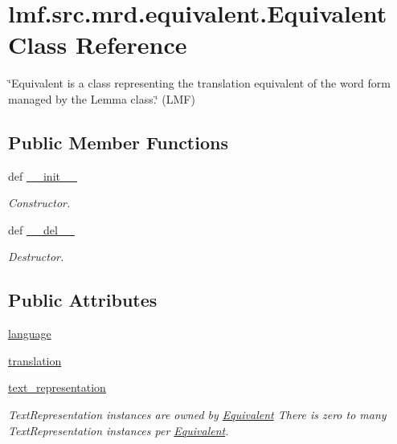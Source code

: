 \hypertarget{classlmf_1_1src_1_1mrd_1_1equivalent_1_1_equivalent}{\section{lmf.\+src.\+mrd.\+equivalent.\+Equivalent Class Reference}
\label{classlmf_1_1src_1_1mrd_1_1equivalent_1_1_equivalent}
}


\char`\"{}\+Equivalent is a class representing the translation equivalent of the word form managed by the Lemma class.\char`\"{} (L\+M\+F)  


\subsection*{Public Member Functions}
\begin{DoxyCompactItemize}
\item 
def \hyperlink{classlmf_1_1src_1_1mrd_1_1equivalent_1_1_equivalent_a155c0d440417e4b5edccbfb761da26b8}{\+\_\+\+\_\+init\+\_\+\+\_\+}
\begin{DoxyCompactList}\small\item\em Constructor. \end{DoxyCompactList}\item 
def \hyperlink{classlmf_1_1src_1_1mrd_1_1equivalent_1_1_equivalent_ab7030713535aaa3eefe76d833add3247}{\+\_\+\+\_\+del\+\_\+\+\_\+}
\begin{DoxyCompactList}\small\item\em Destructor. \end{DoxyCompactList}\end{DoxyCompactItemize}
\subsection*{Public Attributes}
\begin{DoxyCompactItemize}
\item 
\hyperlink{classlmf_1_1src_1_1mrd_1_1equivalent_1_1_equivalent_a72fc245f7193aba7f5c132eee799bcde}{language}
\item 
\hyperlink{classlmf_1_1src_1_1mrd_1_1equivalent_1_1_equivalent_a77291abfc219bae6b51d8994d3c844a2}{translation}
\item 
\hyperlink{classlmf_1_1src_1_1mrd_1_1equivalent_1_1_equivalent_a6912524a8f1ac4a8203f6fa386d2f5a1}{text\+\_\+representation}
\begin{DoxyCompactList}\small\item\em Text\+Representation instances are owned by \hyperlink{classlmf_1_1src_1_1mrd_1_1equivalent_1_1_equivalent}{Equivalent} There is zero to many Text\+Representation instances per \hyperlink{classlmf_1_1src_1_1mrd_1_1equivalent_1_1_equivalent}{Equivalent}. \end{DoxyCompactList}\end{DoxyCompactItemize}



